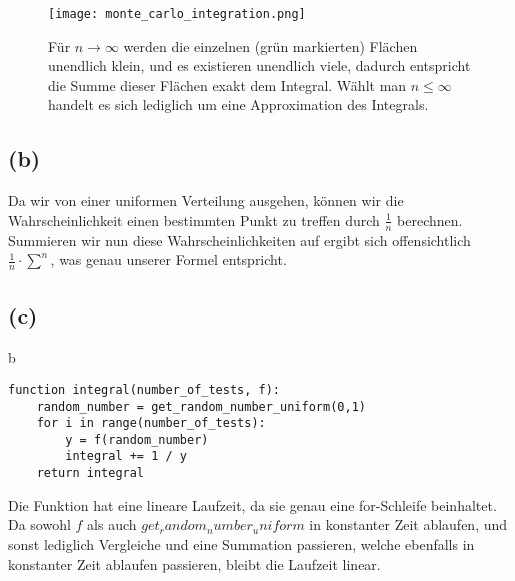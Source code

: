 \documentclass[a4paper]{scrartcl}
\begin{document}
\begin{figure}[h]
	\texttt{[image: monte\_carlo\_integration.png]}
	\caption{Für $n \rightarrow \infty$ werden die einzelnen (grün markierten) Flächen unendlich klein, und es existieren unendlich viele, dadurch entspricht die Summe dieser Flächen exakt dem Integral. Wählt man $n \leq \infty$ handelt es sich lediglich um eine Approximation des Integrals.}
\end{figure}


\subsection*{(b)}
Da wir von einer uniformen Verteilung ausgehen, können wir die Wahrscheinlichkeit einen bestimmten Punkt zu treffen durch $\frac{1}{n}$ berechnen.\\ 
Summieren wir nun diese Wahrscheinlichkeiten auf ergibt sich offensichtlich $\frac{1}{n} \cdot \sum_{}^{n}$, was genau unserer Formel entspricht.



\subsection*{(c)}b
\begin{lstlisting}
function integral(number_of_tests, f):
	random_number = get_random_number_uniform(0,1)
	for i in range(number_of_tests):
		y = f(random_number)
		integral += 1 / y
	return integral
\end{lstlisting}
Die Funktion hat eine lineare Laufzeit, da sie genau eine for-Schleife beinhaltet. Da sowohl $f$ als auch $get_random_number_uniform$ in konstanter Zeit ablaufen, und sonst lediglich Vergleiche und eine Summation passieren, welche ebenfalls in konstanter Zeit ablaufen passieren, bleibt die Laufzeit linear.
\end{document}
